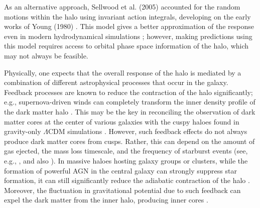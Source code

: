 As an alternative approach, Sellwood et al. (2005) \citep[][]{2005ApJ...634...70S} accounted for the random motions within the halo using invariant action integrals, developing on the early works of Young (1980) \citep{1980ApJ...242.1232Y}. This model gives a better approximation of the response even in modern hydrodynamical simulations \citep{2020MNRAS.495...12C}; however, making predictions using this model requires access to orbital phase space information of the halo, which may not always be feasible.

Physically, one expects that the overall response of the halo is mediated by a combination of different astrophysical processes that occur in the galaxy. Feedback processes are known to reduce the contraction of the halo significantly; e.g., supernova-driven winds can completely transform the inner density profile of the dark matter halo \citep[][]{1996MNRAS.283L..72N}. This may be the key in reconciling the observation of dark matter cores at the center of various galaxies with the cuspy haloes found in gravity-only $\Lambda$CDM simulations \citep[see][for a review]{2014Natur.506..171P}. However, such feedback effects do not always produce dark matter cores from cusps. Rather, this can depend on the amount of gas ejected, the mass loss timescale, and the frequency of starburst events (see, e.g., \citealp{2011ApJ...736L...2O,2014ApJ...793...46O,2012MNRAS.421.3464P}, and also \citealp{bfln18}). In massive haloes hosting galaxy groups or clusters, while the formation of powerful AGN in the central galaxy can strongly suppress star formation, it can still significantly reduce the adiabatic contraction of the halo \citep[][]{2011MNRAS.414..195T}. Moreover, the fluctuation in gravitational potential due to such feedback can expel the dark matter from the inner halo, producing inner cores \citep[][]{2012MNRAS.422.3081M}.




